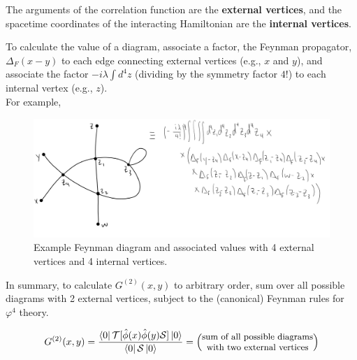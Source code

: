 \noindent The arguments of the correlation function are the \textbf{external vertices}, and the spacetime coordinates of the interacting Hamiltonian are the \textbf{internal vertices}.

\noindent To calculate the value of a diagram, associate a factor, the Feynman propagator, $\Delta_F(x-y)$ to each edge connecting external vertices (e.g., $x$ and $y$), and associate the factor $-i\lambda \int d^4 z$ (dividing by the symmetry factor $4!$) to each internal vertex (e.g., $z$). \\

\noindent For example,

\begin{figure}[H]
	\centering
	\includegraphics[scale=0.3]{4int4ext.png}
	\caption{Example Feynman diagram and associated values with 4 external vertices and 4 internal vertices.}
\end{figure}

\noindent In summary, to calculate $G^{(2)}(x,y)$ to arbitrary order, sum over all possible diagrams with 2 external vertices, subject to the (canonical) Feynman rules for $\varphi^4$ theory.

\begin{equation}
G^{(2)}(x,y) = \frac{\bra{0}\mathcal{T}[\hat{\phi}(x)\hat{\phi}(y)\mathcal{S}]\ket{0}}{\bra{0}\mathcal{S}\ket{0}} = \left(\text{\small {\stackanchor{sum of all possible diagrams}{with two external vertices}}}\right)
\end{equation}

